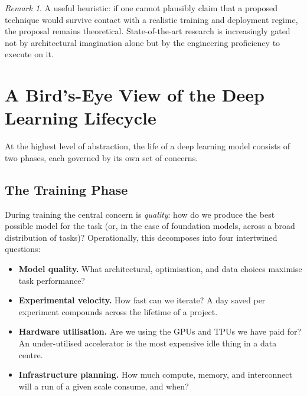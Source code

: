 \documentclass[11pt,a4paper]{article}
\theoremstyle{definition}
\theoremstyle{remark}
\newtheorem*{remark}{Remark}
\theoremstyle{plain}
\begin{document}
\begin{remark}
A useful heuristic: if one cannot plausibly claim that a proposed
technique would survive contact with a realistic training and
deployment regime, the proposal remains theoretical. State-of-the-art
research is increasingly gated not by architectural imagination alone
but by the engineering proficiency to execute on it.
\end{remark}

\section{A Bird's-Eye View of the Deep Learning Lifecycle}

At the highest level of abstraction, the life of a deep learning model
consists of two phases, each governed by its own set of concerns.

\begin{center}
\end{center}

\subsection{The Training Phase}

During training the central concern is \emph{quality}: how do we
produce the best possible model for the task (or, in the case of
foundation models, across a broad distribution of tasks)?
Operationally, this decomposes into four intertwined questions:

\begin{itemize}[leftmargin=1.5em, itemsep=2pt]
    \item \textbf{Model quality.} What architectural, optimisation,
          and data choices maximise task performance?
    \item \textbf{Experimental velocity.} How fast can we iterate? A
          day saved per experiment compounds across the lifetime of a
          project.
    \item \textbf{Hardware utilisation.} Are we using the GPUs and
          TPUs we have paid for? An under-utilised accelerator is the
          most expensive idle thing in a data centre.
    \item \textbf{Infrastructure planning.} How much compute, memory,
          and interconnect will a run of a given scale consume, and
          when?
\end{itemize}
\end{document}
